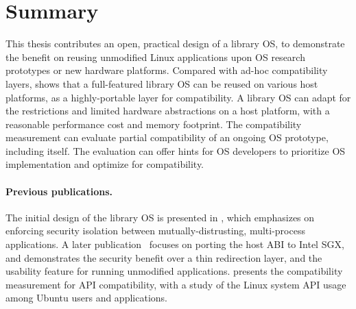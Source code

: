 


\section{Summary}

This thesis contributes an open, practical design of a library OS,
to demonstrate the benefit on reusing unmodified Linux applications upon OS research prototypes or new hardware platforms.
Compared with ad-hoc compatibility layers, \graphene{} shows that
a full-featured library OS can be reused on various host platforms, as a highly-portable layer for compatibility.
A library OS can adapt for the restrictions and
limited hardware abstractions on a host platform, with a reasonable performance cost and memory footprint.
The compatibility measurement
can evaluate partial compatibility of an ongoing OS prototype, including \graphene{} itself. The evaluation can offer hints for OS developers to prioritize
OS implementation and optimize for compatibility.

\paragraph{Previous publications.}
The initial design of the \graphene{} library OS is presented in \cite{tsai14graphene}, which emphasizes on enforcing security isolation between mutually-distrusting, multi-process applications.
A later publication~\cite{tsai17graphene-sgx} focuses on porting the host ABI
to Intel SGX, and demonstrates the security benefit 
over a thin redirection layer, and the usability feature for running unmodified applications.
\cite{tsai16apistudy} presents the compatibility measurement for API compatibility,
with a study of the Linux system API usage among Ubuntu users and applications.

